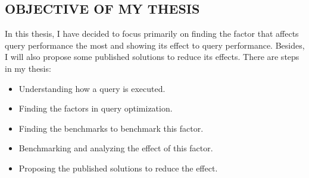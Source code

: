 \begin{flushleft}
\subsection{OBJECTIVE OF MY THESIS}
{\justify 
In this thesis, I have decided to focus primarily on finding the factor that affects query performance the most and showing its effect to query performance. Besides, I will also propose some published solutions to reduce its effects. There are steps in my thesis:
\begin{itemize}
\item Understanding how a query is executed.
\item Finding the factors in query optimization.
\item Finding the benchmarks to benchmark this factor.
\item Benchmarking and analyzing the effect of this factor.
\item Proposing the published solutions to reduce the effect.
\end{itemize}
\par}
\vspace{0.5cm}

\end{flushleft}